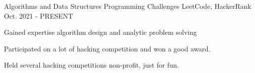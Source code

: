 


\begin{cventries}


\cventry
{Algorithms and Data Structures} %
{Programming Challenges} %
{LeetCode, HackerRank} %
{Oct. 2021 - PRESENT} %
{ %
\begin{cvitems}
\item {Gained expertise algorithm design and analytic problem solving}
\item {Participated on a lot of hacking competition and won a good award.}
\item {Held several hacking competitions non-profit, just for fun.}
\end{cvitems}
}

\end{cventries}
